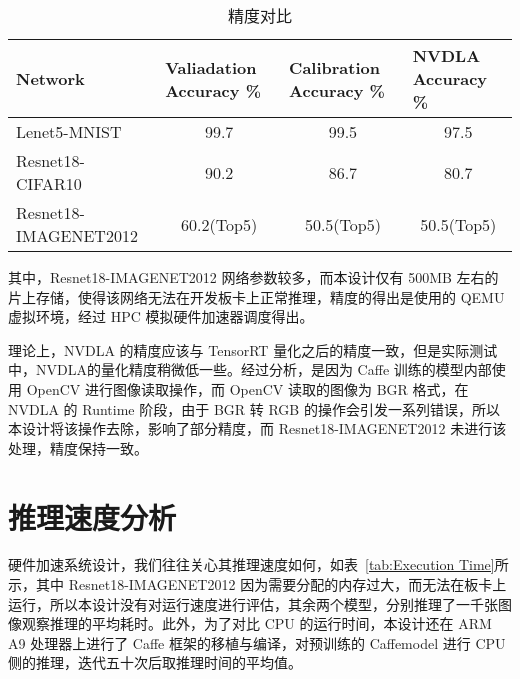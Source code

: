 \begin{table}[!htbp]
    \caption{精度对比}
    \label{tab:Qualifications Report}
    \centering
    \footnotesize%
    \setlength{\tabcolsep}{4pt}%
    \renewcommand{\arraystretch}{1.2}%
    \begin{tabular}{lccc}
        \toprule
        \textbf{Network}      & \multicolumn{1}{l}{\textbf{Valiadation Accuracy \%}} & \multicolumn{1}{l}{\textbf{Calibration Accuracy \%}}  & \multicolumn{1}{l}{\textbf{NVDLA Accuracy \%}} \\
        \midrule
        Lenet5-MNIST          & 99.7                                                 & 99.5                                                 & 97.5                                                 \\  
        Resnet18-CIFAR10      & 90.2                                                 & 86.7                                                 & 80.7                                                 \\
        Resnet18-IMAGENET2012 & 60.2(Top5)                                           & 50.5(Top5)                                           & 50.5(Top5)                                           \\
        \bottomrule                   
    \end{tabular}
\end{table}

其中，Resnet18-IMAGENET2012 网络参数较多，而本设计仅有 500MB 左右的片上存储，使得该网络无法在开发板卡上正常推理，精度的得出是使用的 QEMU 虚拟环境，经过 HPC 模拟硬件加速器调度得出。

理论上，NVDLA 的精度应该与 TensorRT 量化之后的精度一致，但是实际测试中，NVDLA的量化精度稍微低一些。经过分析，是因为 Caffe 训练的模型内部使用 OpenCV 进行图像读取操作，而 OpenCV 读取的图像为 BGR 格式，在 NVDLA 的 Runtime 阶段，由于 BGR 转 RGB 的操作会引发一系列错误，所以本设计将该操作去除，影响了部分精度，而 Resnet18-IMAGENET2012 未进行该处理，精度保持一致。

\section{推理速度分析}

硬件加速系统设计，我们往往关心其推理速度如何，如表~\ref{tab:Execution Time}所示，其中 Resnet18-IMAGENET2012 因为需要分配的内存过大，而无法在板卡上运行，所以本设计没有对运行速度进行评估，其余两个模型，分别推理了一千张图像观察推理的平均耗时。此外，为了对比 CPU 的运行时间，本设计还在 ARM A9 处理器上进行了 Caffe 框架的移植与编译，对预训练的 Caffemodel 进行 CPU 侧的推理，迭代五十次后取推理时间的平均值。

